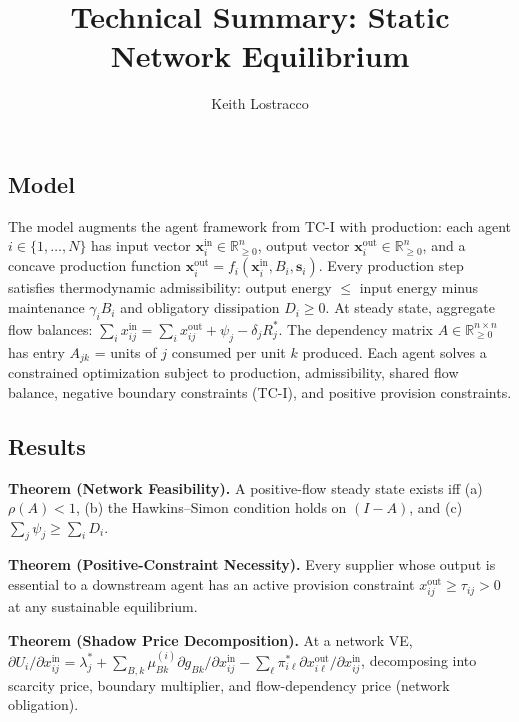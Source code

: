 \documentclass[11pt]{article}
\title{Technical Summary: Static Network Equilibrium}
\author{Keith Lostracco}
\date{}
\begin{document}
\maketitle

\subsection{Model}\label{model}

The model augments the agent framework from TC-I with production: each
agent \(i \in \{1, \ldots, N\}\) has input vector
\(\mathbf{x}_i^{\mathrm{in}} \in \mathbb{R}_{\geq 0}^n\), output vector
\(\mathbf{x}_i^{\mathrm{out}} \in \mathbb{R}_{\geq 0}^n\), and a concave
production function
\(\mathbf{x}_i^{\mathrm{out}} = f_i(\mathbf{x}_i^{\mathrm{in}}, B_i, \mathbf{s}_i)\).
Every production step satisfies thermodynamic admissibility: output
energy \(\leq\) input energy minus maintenance \(\gamma_i B_i\) and
obligatory dissipation \(D_i \geq 0\). At steady state, aggregate flow
balances:
\(\sum_i x_{ij}^{\mathrm{in}} = \sum_i x_{ij}^{\mathrm{out}} + \psi_j - \delta_j R_j^*\).
The dependency matrix \(A \in \mathbb{R}_{\geq 0}^{n \times n}\) has
entry \(A_{jk}\) = units of \(j\) consumed per unit \(k\) produced. Each
agent solves a constrained optimization subject to production,
admissibility, shared flow balance, negative boundary constraints
(TC-I), and positive provision constraints.

\subsection{Results}\label{results}

\textbf{Theorem (Network Feasibility).} A positive-flow steady state
exists iff (a) \(\rho(A) < 1\), (b) the Hawkins--Simon condition holds
on \((I - A)\), and (c) \(\sum_j \psi_j \geq \sum_i D_i\).

\textbf{Theorem (Positive-Constraint Necessity).} Every supplier whose
output is essential to a downstream agent has an active provision
constraint \(x_{ij}^{\mathrm{out}} \geq \tau_{ij} > 0\) at any
sustainable equilibrium.

\textbf{Theorem (Shadow Price Decomposition).} At a network VE,
\(\partial U_i / \partial x_{ij}^{\mathrm{in}} = \lambda_j^* + \sum_{B,k} \mu_{Bk}^{(i)} \partial g_{Bk} / \partial x_{ij}^{\mathrm{in}} - \sum_\ell \pi_{i\ell}^* \partial x_{i\ell}^{\mathrm{out}} / \partial x_{ij}^{\mathrm{in}}\),
decomposing into scarcity price, boundary multiplier, and
flow-dependency price (network obligation).
\end{document}

